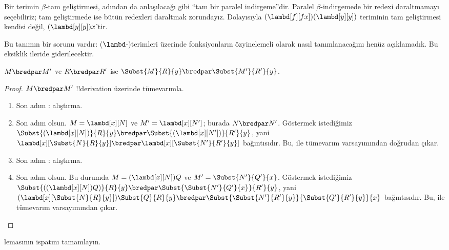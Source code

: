 Bir terimin $\beta$-tam geliştirmesi, adından da anlaşılacağı gibi ``tam bir
paralel indirgeme''dir. Paralel $\beta$-indirgemede bir redexi daraltmamayı
seçebiliriz; tam geliştirmede ise bütün redexleri daraltmak zorundayız.
Dolayısıyla $(\lambd[f][fx])(\lambd[y][y])$ teriminin tam geliştirmesi
kendisi değil, $(\lambd[y][y])x$'tir.

\begin{editorial}
  Bu tanımın bir sorunu vardır: ($\lambd$-)terimleri üzerinde fonksiyonların
  özyinelemeli olarak nasıl tanımlanacağını henüz açıklamadık. Bu eksiklik
  ileride giderilecektir.
\end{editorial}

\begin{lem}
  $M \bredpar M'$ ve $R \bredpar R'$ ise $\Subst{M}{R}{y}
  \bredpar \Subst{M'}{R'}{y}$.
\end{lem}

\begin{proof}
  $M \bredpar M'$ !!{derivation} üzerinde tümevarımla.
  \begin{enumerate}
    \item Son adım : alıştırma.
    \item Son adım  olsun. $M=\lambd[x][N]$ ve
      $M'=\lambd[x][N']$; burada $N\bredpar N'$. Göstermek istediğimiz
      $\Subst{(\lambd[x][N])}{R}{y}\bredpar
      \Subst{(\lambd[x][N'])}{R'}{y}$, yani
      $\lambd[x][\Subst{N}{R}{y}]\bredpar
      \lambd[x][\Subst{N'}{R'}{y}]$ bağıntısıdır. Bu,
       ile tümevarım varsayımından doğrudan çıkar.
    \item Son adım : alıştırma.
    \item Son adım  olsun. Bu durumda
      $M=(\lambd[x][N])Q$ ve $M'=\Subst{N'}{Q'}{x}$. Göstermek istediğimiz
      $\Subst{((\lambd[x][N])Q)}{R}{y}\bredpar
      \Subst{\Subst{N'}{Q'}{x}}{R'}{y}$, yani
      $(\lambd[x][\Subst{N}{R}{y}])\Subst{Q}{R}{y}\bredpar
      \Subst{\Subst{N'}{R'}{y}}{\Subst{Q'}{R'}{y}}{x}$ bağıntısıdır. Bu,
       ile tümevarım varsayımından çıkar.
  \end{enumerate}
\end{proof}

\begin{prob}
   lemasının ispatını tamamlayın.
\end{prob}

